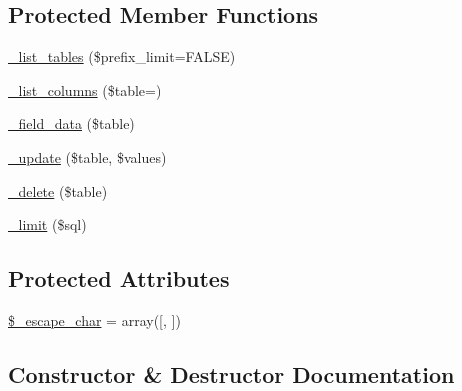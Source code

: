 \subsection*{Protected Member Functions}
\begin{DoxyCompactItemize}
\item 
\mbox{\hyperlink{class_c_i___d_b__pdo__4d__driver_a435c0f3ce54fe7daa178baa8532ebd54}{\+\_\+list\+\_\+tables}} (\$prefix\+\_\+limit=F\+A\+L\+SE)
\item 
\mbox{\hyperlink{class_c_i___d_b__pdo__4d__driver_a7ccb7f9c301fe7f0a9db701254142b63}{\+\_\+list\+\_\+columns}} (\$table=\textquotesingle{}\textquotesingle{})
\item 
\mbox{\hyperlink{class_c_i___d_b__pdo__4d__driver_a95247d9671893adc3444cb184ad32ea1}{\+\_\+field\+\_\+data}} (\$table)
\item 
\mbox{\hyperlink{class_c_i___d_b__pdo__4d__driver_a2540b03a93fa73ae74c10d0e16fc073e}{\+\_\+update}} (\$table, \$values)
\item 
\mbox{\hyperlink{class_c_i___d_b__pdo__4d__driver_a133ea8446ded52589bd22cc9163d0896}{\+\_\+delete}} (\$table)
\item 
\mbox{\hyperlink{class_c_i___d_b__pdo__4d__driver_a3a02ea06541b8ecc25a33a61651562c8}{\+\_\+limit}} (\$sql)
\end{DoxyCompactItemize}
\subsection*{Protected Attributes}
\begin{DoxyCompactItemize}
\item 
\mbox{\hyperlink{class_c_i___d_b__pdo__4d__driver_aaec2fb0112850159063a8e47ad3aed6e}{\$\+\_\+escape\+\_\+char}} = array(\textquotesingle{}\mbox{[}\textquotesingle{}, \textquotesingle{}\mbox{]}\textquotesingle{})
\end{DoxyCompactItemize}


\subsection{Constructor \& Destructor Documentation}
\mbox{\label{class_c_i___d_b__pdo__4d__driver_a9162320adff1a1a4afd7f2372f753a3e}} 
